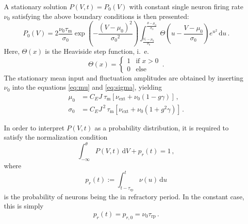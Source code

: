 A stationary solution $P(V, t) = P_0(V)$ with constant 
single neuron firing rate $\nu_0$ 
satisfying the above boundary conditions is then presented:
\begin{equation}
    P_0(V) = 2 \frac{\nu_0 \tau_\text{m}}{\sigma_0} 
        \exp{\left(- \frac{(V - \mu_0)^2}{{\sigma_0}^2} \right)}
        \int_{\frac{V_r - \mu_0}{\sigma_0}}^{\frac{\theta - \mu_0}{\sigma_0}} \! 
            \Theta \left(u - \frac{V - \mu_0}{\sigma_0} \right) e^{u^2} \, \text{d}u  \,. 
    \label{eq:P_V_0}
\end{equation}
Here, $\Theta(x)$ is the Heaviside step function, i.~e. 
\begin{equation}
    \Theta(x) = \begin{cases} 1 & \text{if } x > 0 \\ 0 & \text{else } \end{cases}  \,.
    \label{eq:heaviside}
\end{equation}
The stationary mean input and fluctuation amplitudes are obtained by inserting 
$\nu_0$ into the equations \eqref{eq:mu} and \eqref{eq:sigma}, yielding 
\begin{align}
    \mu_0 	    &= C_E J \:\tau_\text{m} [\nu_\text{ext} + \nu_0(1 - g \gamma)]  \,, \\ 
    \sigma_0 	&= C_E J^{\,2} \,\tau_\text{m} [\nu_\text{ext} + \nu_0(1 + g^2 \gamma)] \,.
    \label{eq:mu_sigma_0}
\end{align}

In order to interpret $P(V, t)$ as a probability distribution, it is required to
satisfy the normalization condition
\begin{equation}
    \int_{-\infty}^{\theta} \! P(V, t) \, \text{d}V  + p_r(t) = 1 \, ,
    \label{eq:P_V_prob}
\end{equation}
where 
\begin{equation}
    p_r(t) := \int_{t - \tau_\text{rp}}^{t} \! \nu(u) \, \text{d}u 
    \label{eq:p_r}
\end{equation}
is the probability of neurons being the in refractory period.
In the constant case, this is simply 
\begin{equation}
    p_r(t) = p_{r, 0} = \nu_0 \tau_\text{rp}  \,.
    \label{eq:p_r_0}
\end{equation}

